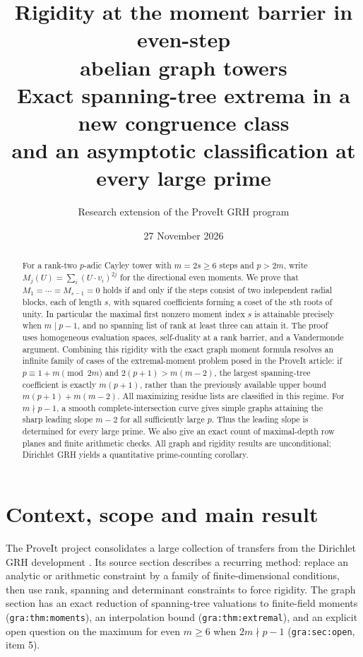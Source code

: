 \documentclass[11pt]{article}
\title{\textbf{Rigidity at the moment barrier in even-step\\ abelian graph towers}\\[5pt]\large Exact spanning-tree extrema in a new congruence class\\ and an asymptotic classification at every large prime}
\author{Research extension of the ProveIt GRH program}
\date{27 November 2026}
\theoremstyle{remark}\newtheorem{remark}[theorem]{Remark}
\begin{document}
\maketitle
\begin{abstract}
For a rank-two $p$-adic Cayley tower with $m=2s\ge6$ steps and $p>2m$, write $M_j(U)=\sum_i(U\cdot v_i)^{2j}$ for the directional even moments. We prove that $M_1=\cdots=M_{s-1}=0$ holds if and only if the steps consist of two independent radial blocks, each of length $s$, with squared coefficients forming a coset of the $s$th roots of unity. In particular the maximal first nonzero moment index $s$ is attainable precisely when $m\mid p-1$, and no spanning list of rank at least three can attain it. The proof uses homogeneous evaluation spaces, self-duality at a rank barrier, and a Vandermonde argument. Combining this rigidity with the exact graph moment formula resolves an infinite family of cases of the extremal-moment problem posed in the ProveIt article: if $p\equiv 1+m\pmod{2m}$ and $2(p+1)>m(m-2)$, the largest spanning-tree coefficient is exactly $m(p+1)$, rather than the previously available upper bound $m(p+1)+m(m-2)$. All maximizing residue lists are classified in this regime. For $m\nmid p-1$, a smooth complete-intersection curve gives simple graphs attaining the sharp leading slope $m-2$ for all sufficiently large $p$. Thus the leading slope is determined for every large prime. We also give an exact count of maximal-depth row planes and finite arithmetic checks. All graph and rigidity results are unconditional; Dirichlet GRH yields a quantitative prime-counting corollary.
\end{abstract}

\section{Context, scope and main result}
The ProveIt project \cite{project,article,graph,source} consolidates a large collection of transfers from the Dirichlet GRH development \cite{upstream}. Its source section describes a recurring method: replace an analytic or arithmetic constraint by a family of finite-dimensional conditions, then use rank, spanning and determinant constraints to force rigidity. The graph section has an exact reduction of spanning-tree valuations to finite-field moments (\texttt{gra:thm:moments}), an interpolation bound (\texttt{gra:thm:extremal}), and an explicit open question on the maximum for even $m\ge6$ when $2m\nmid p-1$ (\texttt{gra:sec:open}, item 5).
\end{document}
